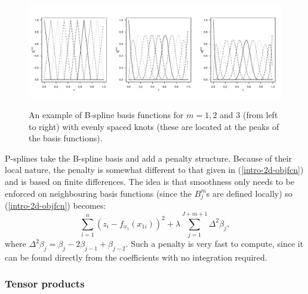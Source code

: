 \begin{figure}[tb]
\centering
\includegraphics[width=6in]{intro/figs/bspline-ex.pdf}\\
\caption{An example of B-spline basis functions for $m=1, 2$ and $3$ (from left to right) with evenly spaced knots (these are located at the peaks of the basis functions).}
\label{bs-basis}
\end{figure}

P-splines take the B-spline basis and add a penalty structure. Because of their local nature, the penalty is somewhat different to that given in (\ref{intro-2d-objfcn}) and is based on finite differences. The idea is that smoothness only needs to be enforced on neighbouring basis functions (since the $B^m_j$s are defined locally) so (\ref{intro-2d-objfcn}) becomes:
\begin{equation*}
\sum_{i=1}^n (z_i - f_{x_1}(x_{1i}))^2 +  \lambda \sum_{j=1}^{J+m+1} \Delta^2 \beta_j,
\end{equation*}
where $\Delta^2 \beta_j = \beta_j -2\beta_{j-1} + \beta_{j-2}$. Such a penalty is very fast to compute, since it can be found directly from the coefficients with no integration required.

\subsubsection{Tensor products}
\label{GAMtensor}

